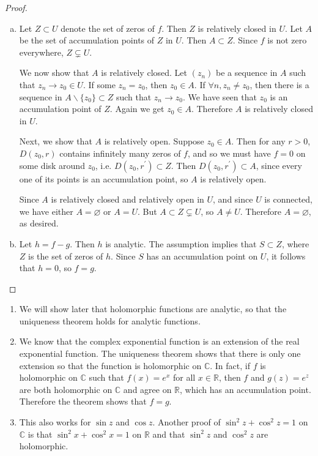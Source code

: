 \begin{proof}
  \begin{enumerate}[(a)]
    \item{
      Let $Z \subset U$ denote the set of zeros of $f$. Then $Z$ is
      relatively closed in $U$. Let $A$ be the set of
      accumulation points of $Z$ in $U$. Then $A \subset Z$.
      Since $f$ is not zero everywhere, $Z \subsetneq U$.

      We now show that $A$ is relatively closed.
      Let $(z_n)$ be a sequence in $A$ such that $z_n \to z_0 \in U$.
      If some $z_n = z_0$, then $z_0 \in A$. If
      $\forall n, z_n \neq z_0$, then there is a sequence in
      $A \backslash \{ z_0 \} \subset Z$ such that $z_n \to z_0$.
      We have seen that $z_0$ is an accumulation point of $Z$.
      Again we get $z_0 \in A$. Therefore $A$ is relatively closed in
      $U$.

      Next, we show that $A$ is relatively open. Suppose $z_0 \in A$. Then for any
      $r > 0$, $D(z_0, r)$ contains infinitely many zeros of $f$, and so
      we must have $f = 0$ on some disk around $z_0$, i.e.
      $D(z_0, r^\prime) \subset Z$. Then $D(z_0, r^\prime) \subset A$,
      since every one of its points is an accumulation point, so
      $A$ is relatively open.

      Since $A$ is relatively closed and relatively open in $U$, and since
      $U$ is connected, we have either $A = \varnothing$ or $A = U$. But
      $A \subset Z \subsetneq U$, so $A \neq U$. Therefore $A = \varnothing$,
      as desired.
    }
    \item{
      Let $h = f - g$. Then $h$ is analytic. The assumption implies that
      $S \subset Z$, where $Z$ is the set of zeros of $h$. Since $S$ has
      an accumulation point on $U$, it follows that $h = 0$, so $f = g$.
    }
  \end{enumerate}
\end{proof}

\begin{remark}
  \begin{enumerate}
    \item{
      We will show later that holomorphic functions are analytic,
      so that the uniqueness theorem holds for analytic functions.
    }
    \item{
      We know that the complex exponential function is an extension
      of the real exponential function. The uniqueness theorem shows
      that there is only one extension so that the function is
      holomorphic on $\mathbb{C}$. In fact, if $f$ is holomorphic on
      $\mathbb{C}$ such that $f(x) = e^x$ for all $x \in \mathbb{R}$,
      then $f$ and $g(z) = e^z$ are both holomorphic on $\mathbb{C}$
      and agree on $\mathbb{R}$, which has an accumulation point.
      Therefore the theorem shows that $f = g$.
    }
    \item{
      This also works for $\sin z$ and $\cos z$. Another proof of
      $\sin^2 z + \cos^2 z = 1$ on $\mathbb{C}$ is that
      $\sin^2 x + \cos^2 x = 1$ on $\mathbb{R}$ and that
      $\sin^2 z$ and $\cos^2 z$ are holomorphic.
    }
  \end{enumerate}
\end{remark}
